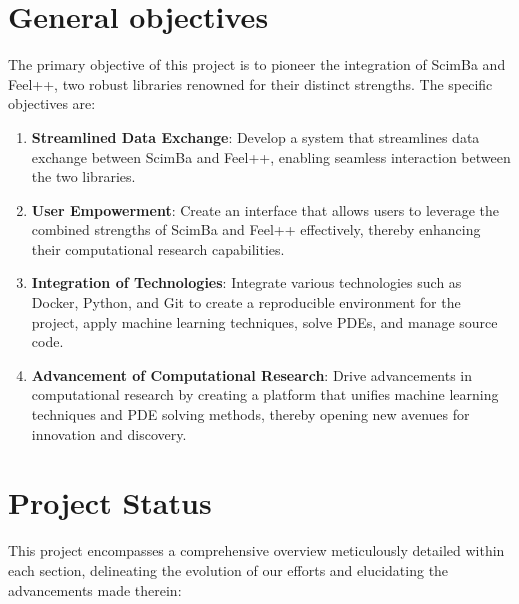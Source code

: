 \documentclass[12pt]{article}
\begin{document}
\section{General objectives}

The primary objective of this project is to pioneer the integration of ScimBa and Feel++, two robust libraries renowned for their distinct strengths. The specific objectives are:

\begin{enumerate}
    \item \textbf{Streamlined Data Exchange}: Develop a system that streamlines data exchange between ScimBa and Feel++, enabling seamless interaction between the two libraries.
    
    \item \textbf{User Empowerment}: Create an interface that allows users to leverage the combined strengths of ScimBa and Feel++ effectively, thereby enhancing their computational research capabilities.
    
    \item \textbf{Integration of Technologies}: Integrate various technologies such as Docker, Python, and Git to create a reproducible environment for the project, apply machine learning techniques, solve PDEs, and manage source code.
    
    \item \textbf{Advancement of Computational Research}: Drive advancements in computational research by creating a platform that unifies machine learning techniques and PDE solving methods, thereby opening new avenues for innovation and discovery.
\end{enumerate}


 




\newpage

\section{Project Status}

This project encompasses a comprehensive overview meticulously detailed within each section, delineating the evolution of our efforts and elucidating the advancements made therein: 
\end{document}
